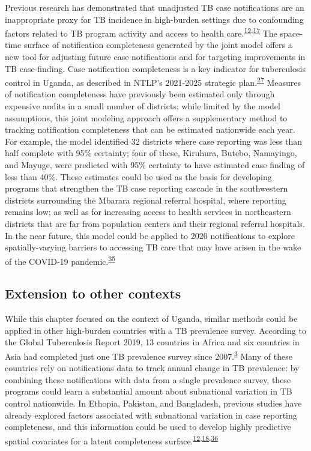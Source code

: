 \documentclass[
]{article}
\begin{document}
Previous research has demonstrated that unadjusted TB case notifications are an inappropriate proxy for TB incidence in high-burden settings due to confounding factors related to TB program activity and access to health care.\textsuperscript{\protect\hyperlink{ref-Rood2019}{12},\protect\hyperlink{ref-Shaweno2018}{17}} The space-time surface of notification completeness generated by the joint model offers a new tool for adjusting future case notifications and for targeting improvements in TB case-finding. Case notification completeness is a key indicator for tuberculosis control in Uganda, as described in NTLP's 2021-2025 strategic plan.\textsuperscript{\protect\hyperlink{ref-UgandaNationalTuberculosisandLeprosyProgramme2020a}{27}} Measures of notification completeness have previously been estimated only through expensive audits in a small number of districts; while limited by the model assumptions, this joint modeling approach offers a supplementary method to tracking notification completeness that can be estimated nationwide each year. For example, the model identified 32 districts where case reporting was less than half complete with 95\% certainty; four of these, Kiruhura, Butebo, Namayingo, and Mayuge, were predicted with 95\% certainty to have estimated case finding of less than 40\%. These estimates could be used as the basis for developing programs that strengthen the TB case reporting cascade in the southwestern districts surrounding the Mbarara regional referral hospital, where reporting remains low; as well as for increasing access to health services in northeastern districts that are far from population centers and their regional referral hospitals. In the near future, this model could be applied to 2020 notifications to explore spatially-varying barriers to accessing TB care that may have arisen in the wake of the COVID-19 pandemic.\textsuperscript{\protect\hyperlink{ref-Togun2020}{35}}

\hypertarget{extension-to-other-contexts}{%
\subsection{Extension to other contexts}\label{extension-to-other-contexts}}

While this chapter focused on the context of Uganda, similar methods could be applied in other high-burden countries with a TB prevalence survey. According to the Global Tuberculosis Report 2019, 13 countries in Africa and six countries in Asia had completed just one TB prevalence survey since 2007.\textsuperscript{\protect\hyperlink{ref-WorldHealthOrganization2019}{3}} Many of these countries rely on notifications data to track annual change in TB prevalence: by combining these notifications with data from a single prevalence survey, these programs could learn a substantial amount about subnational variation in TB control nationwide. In Ethopia, Pakistan, and Bangladesh, previous studies have already explored factors associated with subnational variation in case reporting completeness, and this information could be used to develop highly predictive spatial covariates for a latent completeness surface.\textsuperscript{\protect\hyperlink{ref-Rood2019}{12},\protect\hyperlink{ref-VanGurp2020}{18},\protect\hyperlink{ref-Shaweno2017}{36}}
\end{document}
